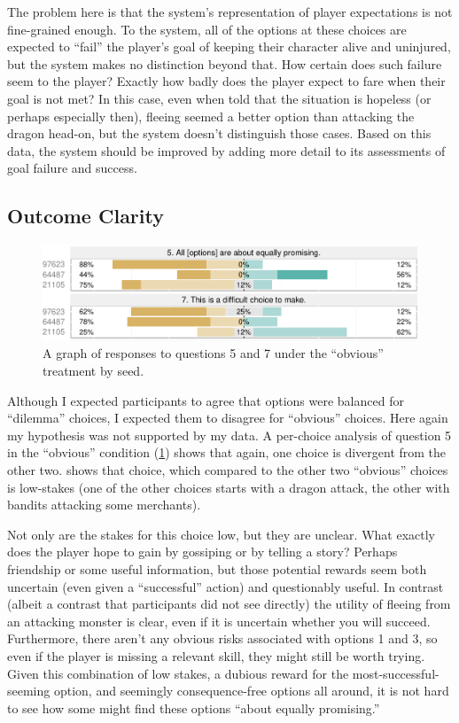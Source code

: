 The problem here is that the system's representation of player expectations is not fine-grained enough.
%
To the system, all of the options at these choices are expected to ``fail'' the player's goal of keeping their character alive and uninjured, but the system makes no distinction beyond that.
%
How certain does such failure seem to the player?
%
Exactly how badly does the player expect to fare when their goal is not met?
%
In this case, even when told that the situation is hopeless (or perhaps especially then), fleeing seemed a better option than attacking the dragon head-on, but the system doesn't distinguish those cases.
%
Based on this data, the system should be improved by adding more detail to its assessments of goal failure and success.


\subsection{Outcome Clarity}


\begin{figure}[!h]
  \includegraphics[width=\textwidth]{fig/obvious-q5-q7.pdf}
  \caption{A graph of responses to questions 5 and 7 under the ``obvious'' treatment by seed.}
  \label{fig:obviousq57}
\end{figure}


Although I expected participants to agree that options were balanced for ``dilemma'' choices, I expected them to disagree for ``obvious'' choices.
%
Here again my hypothesis was not supported by my data.
%
A per-choice analysis of question 5 in the ``obvious'' condition (\cref{fig:obviousq57}) shows that again, one choice is divergent from the other two.
%
 shows that choice, which compared to the other two ``obvious'' choices is low-stakes (one of the other choices starts with a dragon attack, the other with bandits attacking some merchants).


Not only are the stakes for this choice low, but they are unclear.
%
What exactly does the player hope to gain by gossiping or by telling a story?
%
Perhaps friendship or some useful information, but those potential rewards seem both uncertain (even given a ``successful'' action) and questionably useful.
%
In contrast (albeit a contrast that participants did not see directly) the utility of fleeing from an attacking monster is clear, even if it is uncertain whether you will succeed.
%
Furthermore, there aren't any obvious risks associated with options 1 and 3, so even if the player is missing a relevant skill, they might still be worth trying.
%
Given this combination of low stakes, a dubious reward for the most-successful-seeming option, and seemingly consequence-free options all around, it is not hard to see how some might find these options ``about equally promising.''


